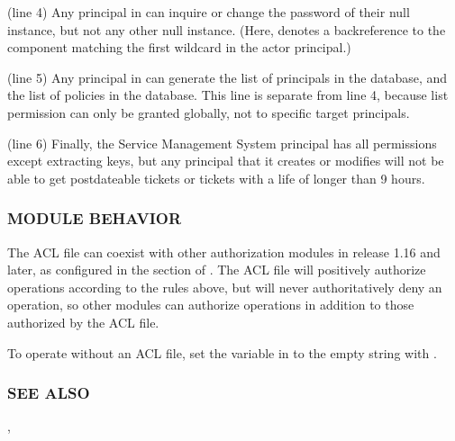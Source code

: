 \documentclass[letterpaper,10pt,english]{sphinxmanual}
\begin{document}
\sphinxAtStartPar
(line 4) Any  principal in  can inquire
or change the password of their null instance, but not any other
null instance.  (Here,  denotes a back\sphinxhyphen{}reference to the
component matching the first wildcard in the actor principal.)

\sphinxAtStartPar
(line 5) Any  principal in  can generate
the list of principals in the database, and the list of policies
in the database.  This line is separate from line 4, because list
permission can only be granted globally, not to specific target
principals.

\sphinxAtStartPar
(line 6) Finally, the Service Management System principal
 has all permissions except extracting keys, but
any principal that it creates or modifies will not be able to get
postdateable tickets or tickets with a life of longer than 9 hours.


\subsubsection{MODULE BEHAVIOR}
\label{\detokenize{admin/conf_files/kadm5_acl:module-behavior}}
\sphinxAtStartPar
The ACL file can coexist with other authorization modules in release
1.16 and later, as configured in the {\hyperref[\detokenize{admin/conf_files/krb5_conf:kadm5-auth}]{}} section of
{\hyperref[\detokenize{admin/conf_files/krb5_conf:krb5-conf-5}]{}}.  The ACL file will positively authorize
operations according to the rules above, but will never
authoritatively deny an operation, so other modules can authorize
operations in addition to those authorized by the ACL file.

\sphinxAtStartPar
To operate without an ACL file, set the  variable in
{\hyperref[\detokenize{admin/conf_files/kdc_conf:kdc-conf-5}]{}} to the empty string with .


\subsubsection{SEE ALSO}
\label{\detokenize{admin/conf_files/kadm5_acl:see-also}}
\sphinxAtStartPar
{\hyperref[\detokenize{admin/conf_files/kdc_conf:kdc-conf-5}]{}}, {\hyperref[\detokenize{admin/admin_commands/kadmind:kadmind-8}]{}}
\end{document}
